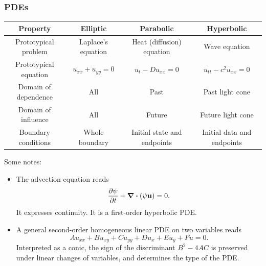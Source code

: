 \documentclass[12pt,letterpaper]{article}
\begin{document}
\subsubsection{PDEs}
\begin{center}
    \begin{tabular}{c||c|c|c}
        Property & Elliptic & Parabolic & Hyperbolic \\
        \hline
        Prototypical problem & Laplace's equation & Heat (diffusion) equation & Wave equation \\
        Prototypical equation & $u_{xx}+u_{yy}=0$ & $u_t-Du_{xx}=0$ & $u_{tt}-c^2u_{xx}=0$ \\
        Domain of dependence & All & Past & Past light cone \\
        Domain of influence & All & Future & Future light cone \\
        Boundary conditions & Whole boundary & Initial state and endpoints & Initial data and endpoints
    \end{tabular}
\end{center}
Some notes:
\begin{itemize}
    \item The advection equation reads
    \[\pdv{\psi}{t}+\div(\psi\vb{u})=0.\]
    It expresses continuity. It is a first-order hyperbolic PDE.
    \item A general second-order homogeneous linear PDE on two variables reads
    \[Au_{xx}+Bu_{xy}+Cu_{yy}+Du_x+Eu_y+Fu=0.\]
    Interpreted as a conic, the sign of the discriminant $B^2-4AC$ is preserved under linear changes of variables, and determines the type of the PDE.
\end{itemize}

\end{document}
